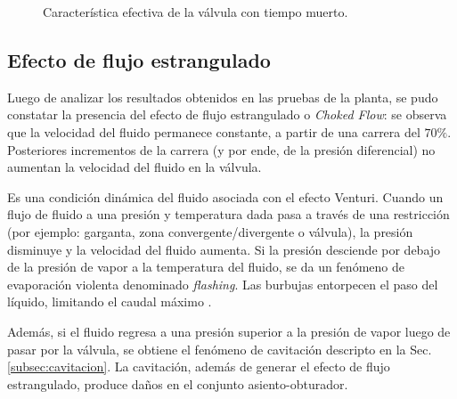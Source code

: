 \begin{figure}[ht]
  \centering
\caption{Característica efectiva de la válvula con tiempo muerto.}
\label{fig:valvulaCtiempoMuerto}
\end{figure}

\subsection{Efecto de flujo estrangulado}
\label{subsec:chokedflow}

Luego de analizar los resultados obtenidos en las pruebas de la planta, se pudo
constatar la presencia del efecto de flujo estrangulado o \emph{Choked
Flow}: se observa que la velocidad del fluido permanece constante, a partir de
una carrera del $70\%$.
Posteriores incrementos de la carrera (y por ende, de la presión diferencial) no
aumentan la velocidad del fluido en la válvula.

Es una condición dinámica del fluido asociada con el efecto Venturi.
Cuando un flujo de fluido a una presión y temperatura dada pasa a través de una
restricción (por ejemplo: garganta, zona convergente/divergente o válvula),
la presión disminuye y la velocidad del fluido aumenta.
Si la presión desciende por debajo de la presión de vapor a la
temperatura del fluido, se da un fenómeno de evaporación violenta denominado
\emph{flashing}.
Las burbujas entorpecen el paso del líquido, limitando el caudal máximo
\cite{bib:controlValveHandbook,bib:ApuntesPuglesiValvulas}.

Además, si el fluido regresa a una presión superior a la presión de vapor luego
de pasar por la válvula, se obtiene el fenómeno de cavitación descripto en la
Sec. \ref{subsec:cavitacion}.
La cavitación, además de generar el efecto de flujo estrangulado, produce daños
en el conjunto asiento-obturador.


